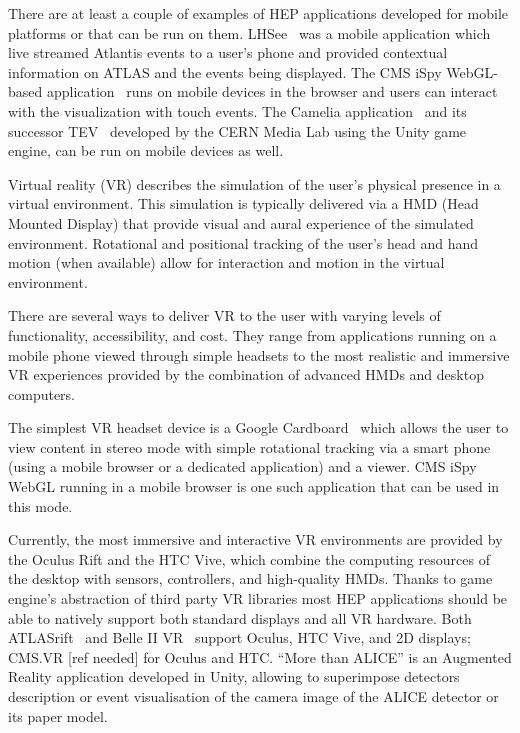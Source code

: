 \documentclass[12pt,a4paper]{article}
\begin{document}
There are at least a couple of examples of HEP applications developed for mobile platforms or that can be run on them. LHSee~\cite{LHSee}
was a mobile application which live streamed Atlantis events to a user’s phone and provided contextual information on ATLAS and the
events being displayed. The CMS iSpy WebGL-based application~\cite{CMSISpyWebGL} runs on mobile devices in the browser and users can interact
with the visualization with touch events. The Camelia application~\cite{CERNCamelia} and its successor TEV~\cite{CERNTEV} developed by the
CERN Media Lab using the Unity game engine, can be run on mobile devices as well.

Virtual reality (VR) describes the simulation of the user’s physical presence in a virtual environment. This simulation is typically
delivered via a HMD (Head Mounted Display) that provide visual and aural experience of the simulated environment. Rotational and
positional tracking of the user’s head and hand motion (when available) allow for interaction and motion in the virtual environment.

There are several ways to deliver VR to the user with varying levels of functionality, accessibility, and cost. They range from
applications running on a mobile phone viewed through simple headsets to the most realistic and immersive VR experiences provided
by the combination of advanced HMDs and desktop computers.

The simplest VR headset device is a Google Cardboard~\cite{GoogleCardboard} which allows the user to view content in stereo mode with
simple rotational tracking via a smart phone (using a mobile browser or a dedicated application) and a viewer. CMS iSpy WebGL running
in a mobile browser is one such application that can be used in this mode.

Currently, the most immersive and interactive VR environments are provided by the Oculus Rift and the HTC Vive, which combine the
computing resources of the desktop with sensors, controllers, and high-quality HMDs. Thanks to game engine’s abstraction of third
party VR libraries most HEP applications should be able to natively support both standard displays and all VR hardware.
Both ATLASrift~\cite{ATLASRift} and Belle II VR~\cite{BelleIIVR} support Oculus, HTC Vive, and 2D displays; CMS.VR [ref needed] for
Oculus and HTC. “More than ALICE” is an Augmented Reality application developed in Unity, allowing to superimpose detectors description or event
visualisation of the camera image of the ALICE detector or its paper model.
\end{document}
